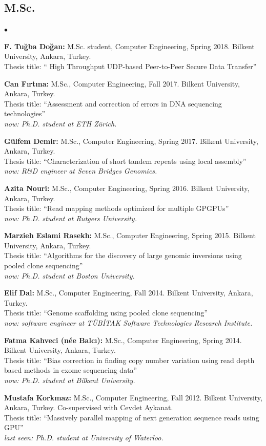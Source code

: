 \documentclass[margin,line]{res}
\newenvironment{list2}{
  \begin{list}{$\bullet$}{%
      \setlength{\itemsep}{0in}
      \setlength{\parsep}{0in} \setlength{\parskip}{0in}
      \setlength{\topsep}{0in} \setlength{\partopsep}{0in} 
      \setlength{\leftmargin}{0.2in}}}{\end{list}}
\begin{document}
\begin{resume}
\subsection{\small \sc M.Sc.}
\begin{list2}
\item
  {\bf F. Tuğba Doğan:} M.Sc. student, Computer Engineering, Spring 2018.
  Bilkent University, Ankara, Turkey. \\
  Thesis title: `` High Throughput UDP-based Peer-to-Peer Secure Data Transfer''
\item
  {\bf Can Fırtına:} M.Sc., Computer Engineering,  Fall 2017.
  Bilkent University, Ankara, Turkey. \\
  Thesis title: ``Assessment and correction of errors in DNA sequencing technologies''\\
  {\it now: Ph.D. student at ETH Zürich.}
\item
  {\bf Gülfem Demir:} M.Sc., Computer Engineering, Spring 2017.
  Bilkent University, Ankara, Turkey. \\
  Thesis title: ``Characterization of short tandem repeats using local assembly''\\
  {\it now: R\&D engineer at Seven Bridges Genomics.}
\item
  {\bf Azita Nouri:} M.Sc., Computer Engineering, Spring 2016.
  Bilkent University, Ankara, Turkey.\\
  Thesis title: ``Read mapping methods optimized for multiple GPGPUs''\\
  {\it now: Ph.D. student at Rutgers University.}
\item
  {\bf Marzieh Eslami Rasekh:} M.Sc., Computer Engineering, Spring 2015.
  Bilkent University, Ankara, Turkey.\\
  Thesis title: ``Algorithms for the discovery of large genomic inversions using pooled clone sequencing''\\
  {\it now: Ph.D. student at Boston University.}
\item
  {\bf Elif Dal:} M.Sc., Computer Engineering, Fall 2014.
  Bilkent University, Ankara, Turkey.\\
  Thesis title: ``Genome scaffolding using pooled clone sequencing''\\
  {\it now: software engineer at TÜBİTAK Software Technologies Research Institute.}
\item
  {\bf Fatma Kahveci (n\'{e}e Balc{\i}):} M.Sc., Computer Engineering, Spring 2014.
  Bilkent University, Ankara, Turkey.\\
  Thesis title: ``Bias correction in finding copy number variation using read depth based methods in exome sequencing data''\\
  {\it now: Ph.D. student at Bilkent University.}
\item
 {\bf Mustafa Korkmaz:} M.Sc., Computer Engineering, Fall 2012.
  Bilkent University, Ankara, Turkey. Co-supervised with Cevdet Aykanat.\\
  Thesis title: ``Massively parallel mapping of next generation sequence reads using GPU''\\
  {\it last seen: Ph.D. student at University of Waterloo.}
\end{list2}
\vspace*{-.4cm}

\end{resume}
\end{document}
